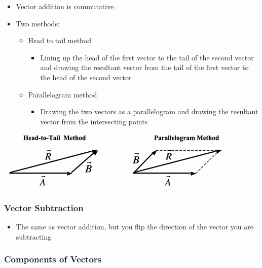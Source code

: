 \documentclass[
  letterpaper,
  DIV=11,
  numbers=noendperiod]{scrartcl}
\providecommand{\tightlist}{%
  \setlength{\itemsep}{0pt}\setlength{\parskip}{0pt}}\usepackage{longtable,booktabs,array}
\begin{document}
\begin{itemize}
\tightlist
\item
  Vector addition is commutative
\item
  Two methods:

  \begin{itemize}
  \tightlist
  \item
    Head to tail method

    \begin{itemize}
    \tightlist
    \item
      Lining up the head of the first vector to the tail of the second
      vector and drawing the resultant vector from the tail of the first
      vector to the head of the second vector
    \end{itemize}
  \item
    Parallelogram method

    \begin{itemize}
    \tightlist
    \item
      Drawing the two vectors as a parallelogram and drawing the
      resultant vector from the intersecting points
    \end{itemize}
  \end{itemize}
\end{itemize}

\includegraphics{img/vector-addition-methods.png}

\hypertarget{vector-subtraction}{%
\subsubsection{Vector Subtraction}\label{vector-subtraction}}

\begin{itemize}
\tightlist
\item
  The same as vector addition, but you flip the direction of the vector
  you are subtracting
\end{itemize}

\hypertarget{components-of-vectors}{%
\subsubsection{Components of Vectors}\label{components-of-vectors}}
\end{document}
